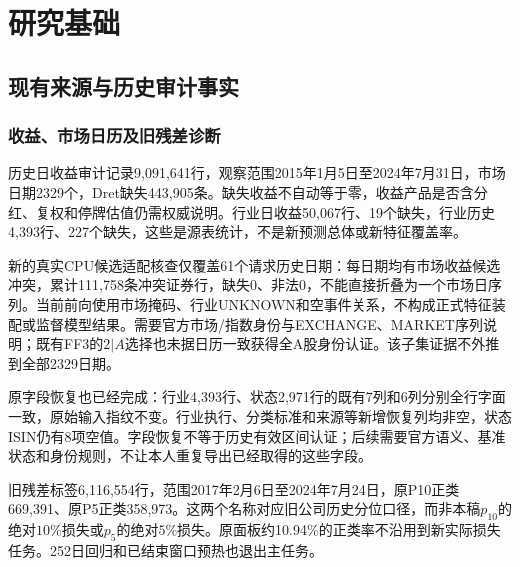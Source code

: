 \chapter{研究基础}
\section{现有来源与历史审计事实}
\subsection{收益、市场日历及旧残差诊断}
历史日收益审计记录9,091,641行，观察范围2015年1月5日至2024年7月31日，市场日期2329个，Dret缺失443,905条。缺失收益不自动等于零，收益产品是否含分红、复权和停牌估值仍需权威说明。行业日收益50,067行、19个缺失，行业历史4,393行、227个缺失，这些是源表统计，不是新预测总体或新特征覆盖率。

新的真实CPU候选适配核查仅覆盖61个请求历史日期：每日期均有市场收益候选冲突，累计111,758条冲突证券行，缺失0、非法0，不能直接折叠为一个市场日序列。当前前向使用市场掩码、行业UNKNOWN和空事件关系，不构成正式特征装配或监督模型结果。需要官方市场/指数身份与EXCHANGE、MARKET序列说明；既有FF3的$2|A$选择也未据日历一致获得全A股身份认证。该子集证据不外推到全部2329日期。

原字段恢复也已经完成：行业4,393行、状态2,971行的既有7列和6列分别全行字面一致，原始输入指纹不变。行业执行、分类标准和来源等新增恢复列均非空，状态ISIN仍有8项空值。字段恢复不等于历史有效区间认证；后续需要官方语义、基准状态和身份规则，不让本人重复导出已经取得的这些字段。

旧残差标签6,116,554行，范围2017年2月6日至2024年7月24日，原P10正类669,391、原P5正类358,973。这两个名称对应旧公司历史分位口径，而非本稿$p_{10}$的绝对$10\%$损失或$p_5$的绝对$5\%$损失。原面板约10.94\%的正类率不沿用到新实际损失任务。252日回归和已结束窗口预热也退出主任务。



